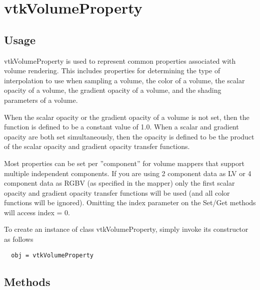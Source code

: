 \section{vtkVolumeProperty}

\subsection{Usage}

 vtkVolumeProperty is used to represent common properties associated 
 with volume rendering. This includes properties for determining the type
 of interpolation to use when sampling a volume, the color of a volume, 
 the scalar opacity of a volume, the gradient opacity of a volume, and the 
 shading parameters of a volume.

 When the scalar opacity or the gradient opacity of a volume is not set,
 then the function is defined to be a constant value of 1.0. When a
 scalar and gradient opacity are both set simultaneously, then the opacity
 is defined to be the product of the scalar opacity and gradient opacity 
 transfer functions.
 
 Most properties can be set per ''component'' for volume mappers that
 support multiple independent components. If you are using 2 component
 data as LV or 4 component data as RGBV (as specified in the mapper) 
 only the first scalar opacity and gradient opacity transfer functions
 will be used (and all color functions will be ignored). Omitting the
 index parameter on the Set/Get methods will access index = 0.

To create an instance of class vtkVolumeProperty, simply
invoke its constructor as follows
\begin{verbatim}
  obj = vtkVolumeProperty
\end{verbatim}
\subsection{Methods}

